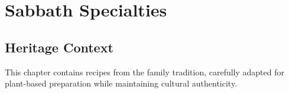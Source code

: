 \chapter{Sabbath Specialties}

\section*{Heritage Context}

This chapter contains recipes from the family tradition, carefully adapted for plant-based preparation while maintaining cultural authenticity.

% 

